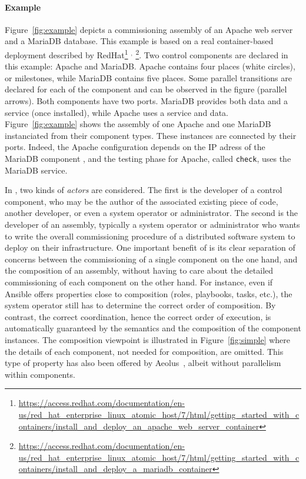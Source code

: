 \paragraph{Example}{ Figure~\ref{fig:example} depicts a \mad
  commissioning assembly of an Apache web server and a MariaDB database. This
  example is based on a real container-based deployment described by
  RedHat\footnote{\url{https://access.redhat.com/documentation/en-us/red_hat_enterprise_linux_atomic_host/7/html/getting_started_with_containers/install_and_deploy_an_apache_web_server_container}}%
  $^,$%
  \footnote{\url{https://access.redhat.com/documentation/en-us/red_hat_enterprise_linux_atomic_host/7/html/getting_started_with_containers/install_and_deploy_a_mariadb_container}}. Two
  \mad control components are declared in this example: Apache and
  MariaDB. Apache contains four places (white circles), or milestones,
  while MariaDB contains five places. Some parallel transitions are
  declared for each of the component and can be observed in the figure
  (parallel arrows). Both components have two ports. MariaDB provides
  both data and a service (once installed), while Apache uses a
  service and data.  Figure~\ref{fig:example} shows the assembly of one
  Apache and one MariaDB instanciated from their component
  types. These instances are connected by their ports. Indeed, the
  Apache configuration depends on the IP adress of the MariaDB
  component , and the testing phase for Apache, called \texttt{check},
  uses the MariaDB service.} 

In \mad, two kinds of \emph{actors} are considered. The first is the
developer of a control component, who may be the author of the
associated existing piece of code, another developer, or even a system
operator or administrator. The second is the developer of an assembly,
typically a system operator or administrator who wants to write the
overall commissioning procedure of a distributed software system to
deploy on their infrastructure. One important benefit of \mad is its
clear separation of concerns between the commissioning of a single
component on the one hand, and the composition of an assembly, without
having to care about the detailed commissioning of each component on
the other hand. For instance, even if Ansible offers properties close
to composition (\eg roles, playbooks, tasks, etc.), the system
operator still has to determine the correct order of composition. By
contrast, the correct coordination, hence the correct order of
execution, is automatically guaranteed by the \mad semantics and the
composition of the component instances. The composition viewpoint is
illustrated in Figure~\ref{fig:simple} where the details of each
component, not needed for composition, are omitted. This type of
property has also been offered by Aeolus~\cite{dicosmo2014ic}, albeit
without parallelism within components.

